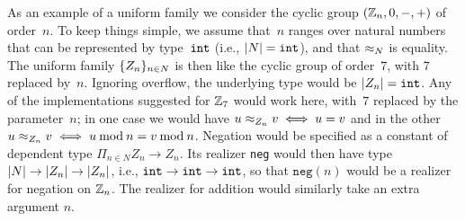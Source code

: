 \iflong
As an example of a uniform family we consider the cyclic group
$(\mathbb{Z}_n, 0, {-}, {+})$ of order~$n$. To keep things simple, we assume
that~$n$ ranges over natural numbers that can be represented by
type~$\mathtt{int}$ (i.e., $|N|=\mathtt{int}$), and that $\approx_N$ is equality.
%
The uniform family $\{Z_n\}_{n \in N}$ is then like the cyclic
group of order~$7$, with $7$ replaced by~$n$. Ignoring overflow, the
underlying type would be $|Z_n| = \mathtt{int}$. Any of the
implementations suggested for $\mathbb{Z}_7$ would work here, with~$7$
replaced by the parameter~$n$; in one case we would have $u \approx_{Z_n}
v \iff u = v$ and in the other $u \approx_{Z_n} v \iff u
\mathbin{\mathrm{mod}} n = v \mathbin{\mathrm{mod}} n$.
%
Negation would be specified as a constant of dependent type
$\Pi_{n \in N} Z_n \to Z_n$. Its realizer \texttt{neg} would then have
type $|N|\to|Z_n|\to{|Z_n|}$, i.e.,
$\mathtt{int}\to\mathtt{int}\to\mathtt{int}$, so that $\mathtt{neg}(n)$ would be a realizer
for negation on $\mathbb{Z}_n$. The realizer for addition would similarly
take an extra argument $n$.

\fi %


